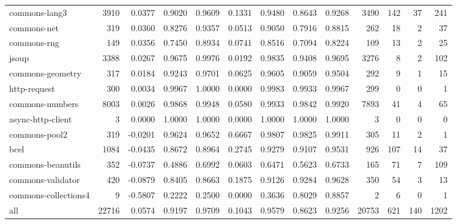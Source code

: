 \begin{table}
\begin{tabular}{lrrrrrrrrrrrr}
          commons-lang3 &   3910 &      0.0377 &  0.9020 &     0.9609 &     0.1331 &  0.9480 &     0.8643 &   0.9268 &   3490 &  142 &   37 &   241 \\
            commons-net &    319 &      0.0360 &  0.8276 &     0.9357 &     0.0513 &  0.9050 &     0.7916 &   0.8815 &    262 &   18 &    2 &    37 \\
            commons-rng &    149 &      0.0356 &  0.7450 &     0.8934 &     0.0741 &  0.8516 &     0.7094 &   0.8224 &    109 &   13 &    2 &    25 \\
                  jsoup &   3388 &      0.0267 &  0.9675 &     0.9976 &     0.0192 &  0.9835 &     0.9408 &   0.9695 &   3276 &    8 &    2 &   102 \\
       commons-geometry &    317 &      0.0184 &  0.9243 &     0.9701 &     0.0625 &  0.9605 &     0.9059 &   0.9504 &    292 &    9 &    1 &    15 \\
           http-request &    300 &      0.0034 &  0.9967 &     1.0000 &     0.0000 &  0.9983 &     0.9933 &   0.9967 &    299 &    0 &    0 &     1 \\
        commons-numbers &   8003 &      0.0026 &  0.9868 &     0.9948 &     0.0580 &  0.9933 &     0.9842 &   0.9920 &   7893 &   41 &    4 &    65 \\
      async-http-client &      3 &      0.0000 &  1.0000 &     1.0000 &     0.0000 &  1.0000 &     1.0000 &   1.0000 &      3 &    0 &    0 &     0 \\
          commons-pool2 &    319 &     -0.0201 &  0.9624 &     0.9652 &     0.6667 &  0.9807 &     0.9825 &   0.9911 &    305 &   11 &    2 &     1 \\
                   bcel &   1084 &     -0.0435 &  0.8672 &     0.8964 &     0.2745 &  0.9279 &     0.9107 &   0.9531 &    926 &  107 &   14 &    37 \\
      commons-beanutils &    352 &     -0.0737 &  0.4886 &     0.6992 &     0.0603 &  0.6471 &     0.5623 &   0.6733 &    165 &   71 &    7 &   109 \\
      commons-validator &    420 &     -0.0879 &  0.8405 &     0.8663 &     0.1875 &  0.9126 &     0.9284 &   0.9628 &    350 &   54 &    3 &    13 \\
   commons-collections4 &      9 &     -0.5807 &  0.2222 &     0.2500 &     0.0000 &  0.3636 &     0.8029 &   0.8857 &      2 &    6 &    0 &     1 \\
                    all &  22716 &      0.0574 &  0.9197 &     0.9709 &     0.1043 &  0.9579 &     0.8623 &   0.9256 &  20753 &  621 &  140 &  1202 \\
\bottomrule
\end{tabular}
\end{table}
